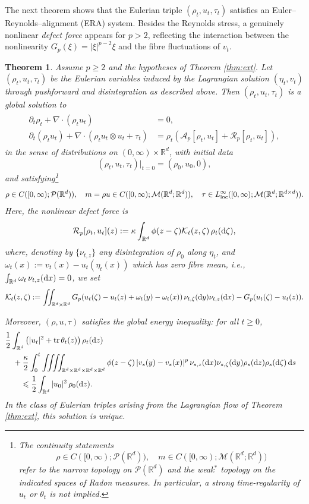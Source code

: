 \documentclass[10pt,reqno]{amsart}
\renewcommand{\geq}{\geqslant}
\renewcommand{\le}{\leqslant}
\numberwithin{equation}{section}
\newtheorem{theorem}{Theorem}[section]
\newcommand{\R}{\mathbb R}
\newcommand{\bq}{\begin{equation}}
\newcommand{\eq}{\end{equation}}
\newcommand{\lt}{\left}
\newcommand{\rt}{\right}
\newcommand{\pa}{\partial}
\newcommand{\intr}{\int_{\R^d}}
\newcommand{\intrr}{\iint_{\R^d \times \R^d}}
\newcommand{\calA}{\mathcal A}
\newcommand{\calK}{\mathcal K}
\newcommand{\calM}{\mathcal M}
\newcommand{\calP}{\mathcal P}
\newcommand{\calR}{\mathcal R}
\newcommand{\rd}{\textnormal{d}}
\newcommand{\dx}{\textnormal{d}x}
\newcommand{\dy}{\textnormal{d}y}
\newcommand{\dz}{\textnormal{d}z}
\newcommand{\ds}{\textnormal{d}s}
\begin{document}
The next theorem shows that the Eulerian triple $(\rho_t,u_t,\tau_t)$ satisfies an Euler--Reynolds--alignment (ERA) system.  Besides the Reynolds stress, a genuinely nonlinear \emph{defect force} appears for $p>2$, reflecting the interaction between the nonlinearity $G_p(\xi)=|\xi|^{p-2}\xi$ and the fibre fluctuations of $v_t$.
 
\begin{theorem} \label{thm:ERA}
Assume $p \geq 2$ and the hypotheses of Theorem \ref{thm:ext}. Let $(\rho_t, u_t, \tau_t)$ be the Eulerian variables induced by the Lagrangian solution $(\eta_t,v_t)$ through pushforward and disintegration as described above. Then $(\rho_t, u_t, \tau_t)$ is a global solution to 
\begin{align}\label{eq:ERA}
\begin{aligned}
\pa_t\rho_t+\nabla \cdot(\rho_t u_t)&=0, \\
\pa_t(\rho_t u_t)+\nabla \cdot(\rho_t u_t\otimes u_t + \tau_t)
&=\rho_t\lt(\calA_p[\rho_t,u_t]+\calR_p[\rho_t,u_t]\rt), 
\end{aligned}
\end{align}
in the sense of distributions on $(0,\infty)\times\R^d$, with initial data 
\[
(\rho_t, u_t, \tau_t)|_{t=0} = (\rho_0, u_0, 0),
\]
and satisfying\footnote{The continuity statements 
\[
\rho\in C([0,\infty);\calP(\R^d)),\quad
m\in C([0,\infty);\calM(\R^d;\R^d)) 
\]
refer to the narrow topology on $\calP(\R^d)$ and the weak$^\ast$
topology on the indicated spaces of Radon measures. In particular, a strong time-regularity of $u_t$ or $\theta_t$ is not implied.
}
\[
\rho \in C([0,\infty);\calP(\R^d)),\quad m=\rho u \in C([0,\infty);\calM(\R^d;\R^d)), \quad \tau \in L^\infty_{\rm loc}([0,\infty);\calM(\R^d;\R^{d \times d})).
\]
Here, the nonlinear defect force is
\[
\calR_p[\rho_t,u_t](z) :=\kappa\intr\phi(z-\zeta) \calK_t(z,\zeta)\,\rho_t(\rd\zeta),
\]
where, denoting by $\{\nu_{t,z}\}$ any disintegration of $\rho_0$ along $\eta_t$, and $\omega_t(x):=v_t(x)-u_t(\eta_t(x))$ which has zero fibre mean, i.e., $\intr \omega_t\,\nu_{t,z}(\dx)=0$, we set
\bq\label{calK}
\calK_t(z,\zeta) := \intrr   G_p(u_t(\zeta)-u_t(z)+\omega_t(y)-\omega_t(x)) \,\nu_{t,\zeta}(\dy) \nu_{t,z}(\dx) - G_p(u_t(\zeta)-u_t(z)).
\eq

Moreover, $(\rho,u,\tau)$ satisfies the global energy inequality:
for all $t\geq 0$,
\begin{align}\label{ERA_energy}
\begin{aligned}
&\frac12 \intr \left(|u_t|^2+{\rm tr}\,\theta_t(z)\right)\rho_t(\dz)\cr
&\quad +\frac{\kappa}{2} \int_0^t\iiiint_{\R^d \times \R^d \times \R^d \times \R^d} \phi(z-\zeta)\,|v_s(y)-v_s(x)|^p \,\nu_{s,z}(\dx)\nu_{s,\zeta}(\dy) \rho_s(\dz)\rho_s(\rd\zeta)\, \ds \cr
&\qquad \le \frac12\intr |u_0|^2 \,\rho_0(\dz).
\end{aligned}
\end{align}
In the class of Eulerian triples arising from the Lagrangian flow of Theorem \ref{thm:ext}, this solution is unique.
\end{theorem}
\end{document}
